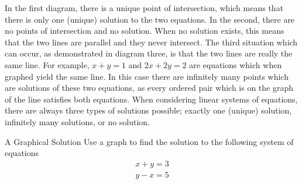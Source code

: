 In the first diagram, there is a unique point of
intersection, which means that there is only one (unique) solution to the two equations. 
In the second, there are no points of intersection and  no solution. When no solution exists, this means that the two lines are parallel and they never intersect.
The third situation which can occur, as demonstrated in diagram three, is that the two lines are really the same line. For
example, $x+y=1$ and $2x+2y=2$ are equations which when graphed yield the
same line. In this case there are infinitely many points which are
solutions of these two equations, as every ordered pair which is on the graph of
the line satisfies both equations. 
When considering linear systems of equations, there are always three types of solutions possible; exactly one (unique) solution, 
infinitely many solutions, or no solution.

\begin{example}{A Graphical Solution}\label{exa:graphicalsoln}
Use a graph to find the solution to the following system of equations \:
\begin{equation*}
\begin{array}{c}
x+y=3 \\
y-x=5
\end{array}
\end{equation*}
\end{example} 

